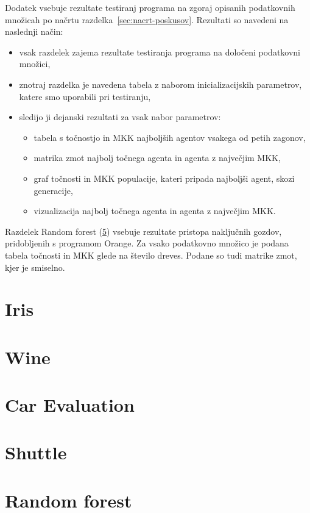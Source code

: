 Dodatek vsebuje rezultate testiranj programa na zgoraj opisanih podatkovnih množicah po načrtu razdelka~\ref{sec:nacrt-poskusov}.
Rezultati so navedeni na naslednji način:
\begin{itemize}
    \item vsak razdelek zajema rezultate testiranja programa na določeni podatkovni množici,
    \item znotraj razdelka je navedena tabela z naborom inicializacijskih parametrov, katere smo uporabili pri testiranju,
    \item sledijo ji dejanski rezultati za vsak nabor parametrov:
    \begin{itemize}
        \item tabela s točnostjo in MKK najboljših agentov vsakega od petih zagonov,
        \item matrika zmot najbolj točnega agenta in agenta z največjim MKK,
        \item graf točnosti in MKK populacije, kateri pripada najboljši agent, skozi generacije,
        \item vizualizacija najbolj točnega agenta in agenta z največjim MKK.
    \end{itemize}
\end{itemize}

Razdelek Random forest (\ref{sec:random-forest-test}) vsebuje rezultate pristopa naključnih gozdov, pridobljenih s programom Orange.
Za vsako podatkovno množico je podana tabela točnosti in MKK glede na število dreves.
Podane so tudi matrike zmot, kjer je smiselno.

\section{Iris}\label{sec:dodatek-iris-test}


\section{Wine}\label{sec:dodatek-wine-test}


\section{Car Evaluation}\label{sec:dodatek-car-test}


\section{Shuttle}\label{sec:dodatek-statlog-test}


\section{Random forest}\label{sec:random-forest-test}


